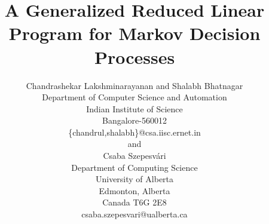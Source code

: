 \documentclass[12pt,draftcls,onecolumn]{IEEEtran}
\title{A Generalized Reduced Linear Program for Markov Decision Processes}
\author{Chandrashekar Lakshminarayanan and Shalabh Bhatnagar\\Department of Computer Science and Automation\\ Indian Institute of Science\\ Bangalore-560012\\\{chandrul,shalabh\}@csa.iisc.ernet.in\\ and \\
Csaba Szepesv\'{a}ri\\Department of Computing Science\\University of Alberta\\Edmonton, Alberta\\Canada T6G 2E8\\  csaba.szepesvari@ualberta.ca }
\begin{document}
\maketitle

%



%


%
%
%





%
%


\newpage
\onecolumn
%
\end{document}
